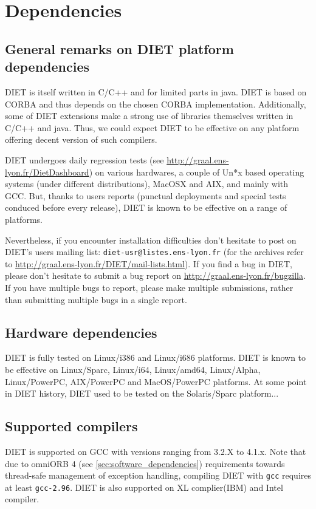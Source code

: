 \section{Dependencies}
\label{sec:dependencies}

\subsection{General remarks on DIET platform dependencies}

DIET is itself written in C/C++ and for limited parts in java. DIET is
based on CORBA and thus depends on the chosen CORBA implementation.
Additionally, some of DIET extensions make a strong use of libraries
themselves written in C/C++ and java.
Thus, we could expect DIET to be effective on any platform offering
decent version of such compilers.

DIET undergoes daily regression tests
(see \url{http://graal.ens-lyon.fr/DietDashboard})
on various hardwares, a couple of Un*x based operating systems (under
different distributions), MacOSX and AIX, and mainly with GCC.
But, thanks to users reports (punctual deployments and special tests
conduced before every release), DIET is known to be effective on a
range of platforms.

Nevertheless, if you encounter installation difficulties don't hesitate
to post on DIET's users mailing list: \verb+diet-usr@listes.ens-lyon.fr+
(for the archives refer to \url{http://graal.ens-lyon.fr/DIET/mail-lists.html}).
If you find a bug in DIET, please don't hesitate to submit a bug report on
\url{http://graal.ens-lyon.fr/bugzilla}. If you have multiple bugs
to report, please make multiple submissions, rather than submitting
multiple bugs in a single report.

\subsection{Hardware dependencies}
DIET is fully tested on Linux/i386 and Linux/i686 platforms.
DIET is known to be effective on Linux/Sparc, Linux/i64, Linux/amd64,
Linux/Alpha, Linux/PowerPC, AIX/PowerPC and MacOS/PowerPC platforms.
At some point in DIET history, DIET used to be tested on the Solaris/Sparc
platform...

\subsection{Supported compilers}
DIET is supported on GCC with versions ranging from 3.2.X to 4.1.x.
Note that due to omniORB 4 (see \ref{sec:software_dependencies}) requirements
towards thread-safe management of exception handling, compiling DIET with
\verb+gcc+ requires at least \verb+gcc-2.96+.
DIET is also supported on XL complier(IBM) and Intel compiler.

